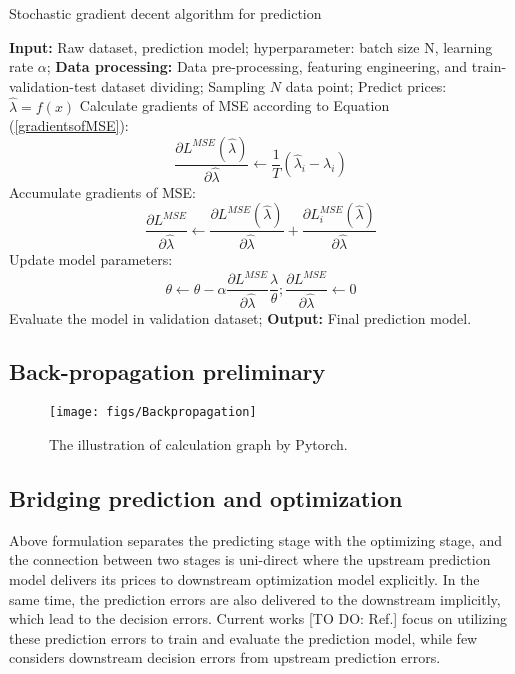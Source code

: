 \documentclass[journal]{IEEEtran}
\newcommand{\slw}{\color{blue}}
\begin{document}
\begin{algorithm}[!t]
  \label{SGDPred}
  \caption{Stochastic gradient decent algorithm for prediction}
  {{
    \begin{algorithmic}[1]
      \STATE \textbf{Input:} Raw dataset, prediction model; hyperparameter: batch size N, learning rate $\alpha$;
      \STATE \textbf{Data processing:} Data pre-processing, featuring engineering, and train-validation-test dataset dividing; 
      \STATE Sampling $N$ data point; 
      \STATE Predict prices: $\hat{\lambda} = f(x)$
      \STATE Calculate gradients of MSE according to Equation (\ref{gradientsofMSE}): $$\frac{\partial L^{MSE}(\hat{\lambda}) }{\partial \hat{\lambda}} \leftarrow  \frac{1}{T} (\hat{\lambda}_i - \lambda_i)$$
      \STATE Accumulate gradients of MSE: $$ \frac{\partial L^{MSE} }{\partial \hat{\lambda}} \leftarrow \frac{\partial L^{MSE}(\hat{\lambda}) }{\partial \hat{\lambda}} + \frac{\partial L_i^{MSE}(\hat{\lambda})}{\partial \hat{\lambda}}$$
      \ENDFOR
      \STATE Update model parameters: $$\theta \leftarrow \theta - \alpha \frac{\partial L^{MSE}}{\partial \hat{\lambda}} \frac{\hat{\lambda}}{\theta}; \frac{\partial L^{MSE}}{\partial \hat{\lambda}} \leftarrow 0$$
      \STATE Evaluate the model in validation dataset;
      \ENDWHILE
      \STATE \textbf{Output:} Final prediction model.
    \end{algorithmic}
  }}
\end{algorithm}

\subsection{Back-propagation preliminary}

{\slw{Explain the back-propagation procedures preliminaries}}

\begin{figure}[ht]
  \centering
  \texttt{[image: figs/Backpropagation]}
  \caption{The illustration of calculation graph by Pytorch.}
  \label{Backpropagation}
\end{figure}


\subsection{Bridging prediction and optimization}
Above formulation separates the predicting stage with the optimizing stage, and the connection between two stages is uni-direct where the upstream prediction model delivers its prices to downstream optimization model explicitly. In the same time, the prediction errors are also delivered to the downstream implicitly, which lead to the decision errors. Current works {\slw [TO DO: Ref.]} focus on utilizing these prediction errors to train and evaluate the prediction model, while few considers downstream decision errors from upstream prediction errors. 
\end{document}
